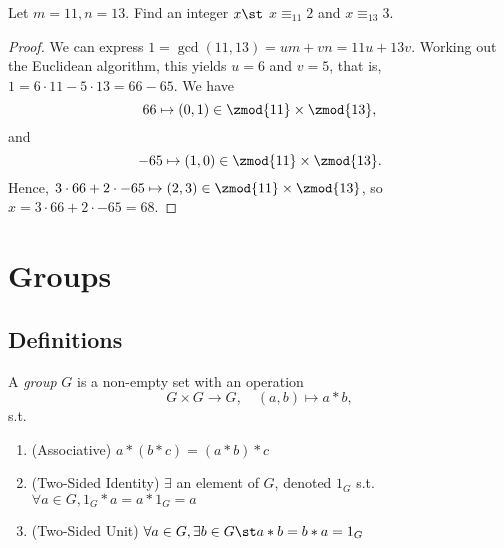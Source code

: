\documentclass[12pt,oneside]{article}
\begin{document}
\begin{example}
  Let $m = 11, n = 13$. Find an integer $x \st$ $x \equiv_{11} 2$ and $x \equiv_{13} 3$.
  \begin{proof}
    We can express $1 = \gcd (11, 13) = um + vn = 11u + 13 v$. Working out the Euclidean algorithm, this yields $u = 6$ and $v = 5$, that is, $1 = 6 \cdot 11 - 5 \cdot 13 = 66 - 65$. We have \[
    66 \mapsto(0, 1) \in \zmod{11} \times \zmod{13},
    \]
    and \[-65 \mapsto (1,0) \in \zmod{11} \times \zmod{13}.\]
    Hence, $3 \cdot 66 + 2 \cdot -65 \mapsto(2, 3) \in \zmod{11}\times\zmod{13}$, so $x = 3 \cdot 66 + 2 \cdot -65 = 68$.
  \end{proof}
\end{example}

\section{Groups}
\subsection{Definitions}
\begin{definition}[Group]
  A \emph{group} $G$ is a non-empty set with an operation \[
  G \times G \to G, \quad (a,b) \mapsto a \ast b,  
  \]
  s.t. \begin{enumerate}
    \item (Associative) $a \ast (b \ast c) = (a\ast b)\ast c$
    \item (Two-Sided Identity) $\exists$ an element of $G$, denoted $1_G$ s.t. $\forall a \in G, 1_G \ast a = a \ast 1_G = a$
    \item (Two-Sided Unit) $\forall a \in G, \exists b \in G \st a \ast b = b \ast a = 1_G$
  \end{enumerate}
\end{definition}
\end{document}
